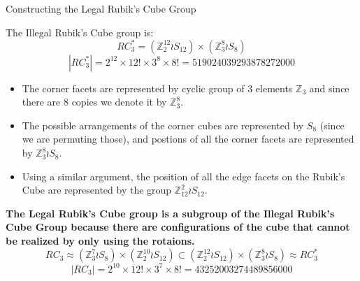 \documentclass[final]{beamer}
\newlength{\colwidth}
\begin{document}
\begin{frame}[t]
\begin{columns}[t]
\begin{column}{\colwidth}
\begin{block}{Constructing the Legal Rubik's Cube Group}
    
    The Illegal Rubik's Cube group is:
    $$RC^{*}_{3} = (\mathbb{Z}^{12}_2 \wr S_{12}) \times (\mathbb{Z}^8_3 \wr S_8)$$
    $$|RC^{*}_{3}| = 2^{12} \times 12! \times 3^8 \times 8! = 519024039293878272000$$
    
\begin{itemize} 
\item The corner facets are represented by cyclic group of 3 elements $\mathbb{Z}_{3}$ and since there are $8$ copies we denote it by $\mathbb{Z}_3 ^8$.
\item The possible arrangements of the corner cubes are represented by $S_{8}$ (since we are permuting those), and postions of all the corner facets are represented by $\mathbb{Z}_{3}^{8} \wr S_{8}$.
\item Using a similar argument, the position of all the edge facets on the Rubik's Cube are represented by the group $\mathbb{Z}_{12}^{2} \wr S_{12}$.
\end{itemize} 

    \textbf{The Legal Rubik's Cube group is a subgroup of the Illegal Rubik's Cube Group because there are configurations of the cube that cannot be realized by only using the rotaions.}
$$RC_{3} \approx (\mathbb{Z}_{3}^{7} \wr S_{8}) \times (\mathbb{Z}_{2}^{10} \wr S_{12}) \subset  (\mathbb{Z}^{12}_2 \wr S_{12}) \times (\mathbb{Z}^8_3 \wr S_8) \approx RC^{*}_{3}$$
$$ |RC_{3}| = 2^{10} \times 12! \times 3^7 \times 8! = 43252003274489856000$$

    




    





\end{block}
\end{column}
\end{columns}
\end{frame}
\end{document}
